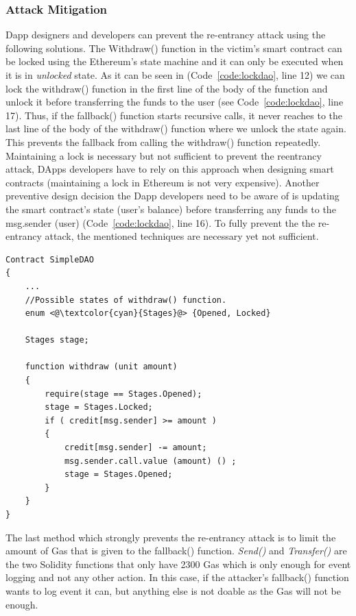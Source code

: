 \subsubsection{Attack Mitigation}
Dapp designers and developers can prevent the re-entrancy attack using the following solutions. The Withdraw() function in the victim's smart contract can be locked using the Ethereum's state machine and it can only be executed when it is in \textit{unlocked} state. As it can be seen in (Code~\ref{code:lockdao}, line 12) we can lock the withdraw() function in the first line of the body of the function and unlock it before transferring the funds to the user (see Code~\ref{code:lockdao}, line 17). Thus, if the fallback() function starts recursive calls, it never reaches to the last line of the body of the withdraw() function where we unlock the state again. This prevents the fallback from calling the withdraw() function repeatedly. Maintaining a lock is necessary but not sufficient to prevent the reentrancy attack, DApps developers have to rely on this approach when designing smart contracts (maintaining a lock in Ethereum is not very expensive). Another preventive design decision the Dapp developers need to be aware of is updating the smart contract’s state (user’s balance) before transferring any funds to the msg.sender (user) (Code~\ref{code:lockdao}, line 16). To fully prevent the the re-entrancy attack, the mentioned techniques are necessary yet not sufficient. 

\begin{lstlisting}[basicstyle=\scriptsize\ttfamily,caption={The simplified version of the DAO smart contract that uses the state machine to lock the withdraw() function.},label={code:lockdao},float]
Contract SimpleDAO 
{
	...
	//Possible states of withdraw() function.
	enum <@\textcolor{cyan}{Stages}@> {Opened, Locked} 
	
	Stages stage;
	
	function withdraw (unit amount)
	{	
		require(stage == Stages.Opened);
		stage = Stages.Locked;
		if ( credit[msg.sender] >= amount )
		{	
			credit[msg.sender] -= amount;	
			msg.sender.call.value (amount) () ;
			stage = Stages.Opened;
		}
	}              
}
\end{lstlisting}
The last method which strongly prevents the re-entrancy attack is to limit the amount of Gas that is given to the fallback() function. \textit{Send()} and \textit{Transfer()} are the two Solidity functions that only have 2300 Gas which is only enough for event logging and not any other action. In this case, if the attacker's fallback() function wants to log event it can, but anything else is not doable as the Gas will not be enough.

